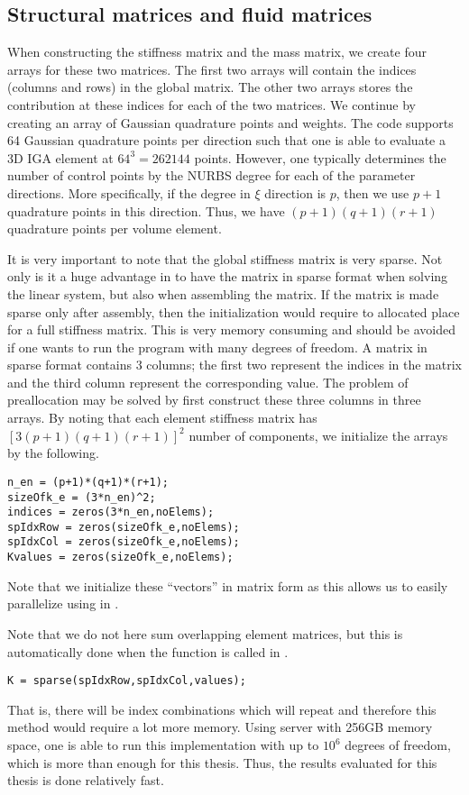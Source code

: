 \subsection{Structural matrices and fluid matrices}
When constructing the stiffness matrix and the mass matrix, we create four arrays for these two matrices. The first two arrays will contain the indices (columns and rows) in the global matrix. The other two arrays stores the contribution at these indices for each of the two matrices. We continue by creating an array of Gaussian quadrature points and weights. The code supports 64 Gaussian quadrature points per direction such that one is able to evaluate a 3D IGA element at $64^3=262144$ points. However, one typically determines the number of control points by the NURBS degree for each of the parameter directions. More specifically, if the degree in $\xi$ direction is $p$, then we use $p+1$ quadrature points in this direction. Thus, we have $(p+1)(q+1)(r+1)$ quadrature points per volume element. 

It is very important to note that the global stiffness matrix is very sparse. Not only is it a huge advantage in \MATLAB to have the matrix in sparse format when solving the linear system, but also when assembling the matrix. If the matrix is made sparse only after assembly, then the initialization would require \MATLAB to allocated place for a full stiffness matrix. This is very memory consuming and should be avoided if one wants to run the program with many degrees of freedom. A matrix in sparse format contains 3 columns; the first two represent the indices in the matrix and the third column represent the corresponding value. The problem of preallocation may be solved by first construct these three columns in three arrays. By noting that each element stiffness matrix has $\left[3(p+1)(q+1)(r+1)\right]^2$ number of components, we initialize the arrays by the following.
\begin{lstlisting}
n_en = (p+1)*(q+1)*(r+1);
sizeOfk_e = (3*n_en)^2;
indices = zeros(3*n_en,noElems); 
spIdxRow = zeros(sizeOfk_e,noElems);
spIdxCol = zeros(sizeOfk_e,noElems);
Kvalues = zeros(sizeOfk_e,noElems); 
\end{lstlisting}
Note that we initialize these ``vectors'' in matrix form as this allows us to easily parallelize using  in \MATLAB.

Note that we do not here sum overlapping element matrices, but this is automatically done when the  function is called in \MATLAB.
\begin{lstlisting}
K = sparse(spIdxRow,spIdxCol,values);
\end{lstlisting}
That is, there will be index combinations which will repeat and therefore this method would require a lot more memory. Using server with 256GB memory space, one is able to run this implementation with up to $10^6$ degrees of freedom, which is more than enough for this thesis. Thus, the results evaluated for this thesis is done relatively fast.

